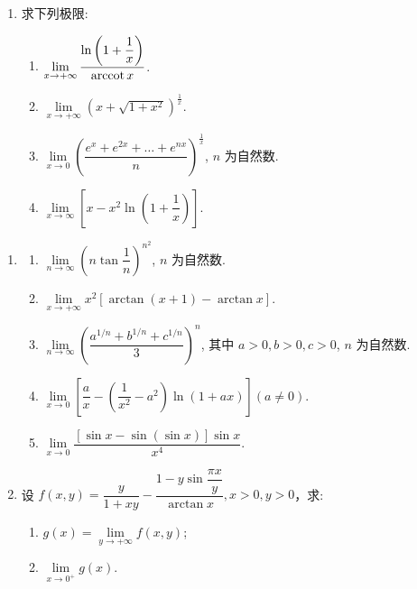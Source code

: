 \newpage

\begin{enumerate}[label=\textbf{\arabic*.}, itemsep=6cm, resume]
    \item 求下列极限:
    \begin{enumerate}[label=(\arabic*)]
        \item $\lim\limits_{x \to +\infty}\dfrac{\ln\left(1+\dfrac{1}{x}\right)}{\operatorname{arccot} x}$.
        \item $\lim\limits_{x \to +\infty} \left(x + \sqrt{1+x^2}\right)^{\frac{1}{x}}$.
        \item $\lim\limits_{x \to 0} \left(\dfrac{e^x + e^{2x} + \dots + e^{nx}}{n}\right)^{\frac{1}{x}}$, $n$ 为自然数.
        \item $\lim\limits_{x \to \infty} \left[x - x^2\ln\left(1+\dfrac{1}{x}\right)\right]$.
    \end{enumerate}
\end{enumerate}

\newpage

\begin{enumerate}[label=\textbf{\arabic*.}, itemsep=6cm, resume]
    \item [5. (续)]
    \begin{enumerate}[label=(\arabic*), start=5]
        \item $\lim\limits_{n \to \infty} \left(n\tan\dfrac{1}{n}\right)^{n^2}$, $n$ 为自然数.
        \item $\lim\limits_{x \to +\infty} x^2\left[\arctan(x+1) - \arctan x\right]$.
        \item $\lim\limits_{n \to \infty} \left(\dfrac{a^{1/n} + b^{1/n} + c^{1/n}}{3}\right)^n$, 其中 $a>0,b>0,c>0$, $n$ 为自然数.
        \item $\lim\limits_{x \to 0} \left[\dfrac{a}{x} - \left(\dfrac{1}{x^2} - a^2\right)\ln(1+ax)\right](a \ne 0)$.
        \item $\lim\limits_{x \to 0} \dfrac{[\sin x - \sin(\sin x)]\sin x}{x^4}$.
    \end{enumerate}
    
    \item 设 $f(x,y) = \dfrac{y}{1+xy} - \dfrac{1-y\sin\dfrac{\pi x}{y}}{\arctan x}, x>0,y>0$，求:
    \begin{enumerate}[label=(\arabic*)]
        \item $g(x) = \lim\limits_{y \to +\infty} f(x,y)$;
        \item $\lim\limits_{x \to 0^+} g(x)$.
    \end{enumerate}
\end{enumerate}


